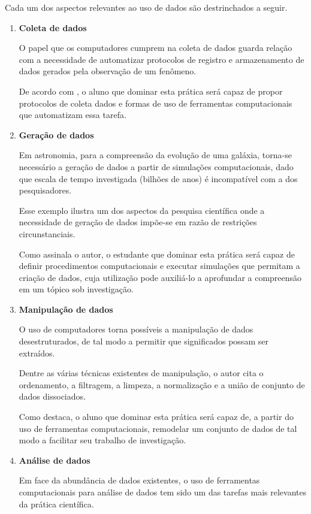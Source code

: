 Cada um dos aspectos relevantes ao uso de dados são destrinchados a seguir.


\begin{enumerate}
  \item \textbf{Coleta de dados}

  O papel que os computadores cumprem na coleta de dados guarda relação com a necessidade de automatizar protocolos de registro e armazenamento de dados gerados pela observação de um fenômeno.
  
  De acordo com , o aluno que dominar esta prática será capaz de propor  protocolos de coleta dados e formas de uso de ferramentas computacionais que automatizam essa tarefa.

  \item \textbf{Geração de dados}
  
  Em astronomia, para a compreensão da evolução de uma galáxia, torna-se necessário a geração de dados a partir de simulações computacionais, dado que escala de tempo investigada (bilhões de anos) é incompatível com a dos pesquisadores.

  Esse exemplo ilustra um dos aspectos da pesquisa científica onde a necessidade de geração de dados impõe-se em razão de restrições circunstanciais.

  Como assinala o autor, o estudante que dominar esta prática será capaz de definir procedimentos computacionais e executar simulações que permitam a criação de dados, cuja utilização pode auxiliá-lo a aprofundar a compreensão em um tópico sob investigação.

  \item \textbf{Manipulação de dados}

  O uso de computadores torna possíveis a manipulação de dados desestruturados, de tal modo a permitir que significados possam  ser extraídos. 

  Dentre as várias técnicas existentes de manipulação, o autor cita o ordenamento, a filtragem, a limpeza, a normalização e a união de conjunto de dados dissociados. 
  
  Como destaca, o aluno que dominar esta prática será capaz de, a partir do uso de ferramentas computacionais, remodelar um conjunto de dados de tal modo a facilitar seu trabalho de investigação.

  \item \textbf{Análise de dados}

  Em face da abundância de dados existentes, o uso de ferramentas computacionais para análise de dados tem sido um das tarefas mais relevantes da prática científica.   
  

\end{enumerate}
